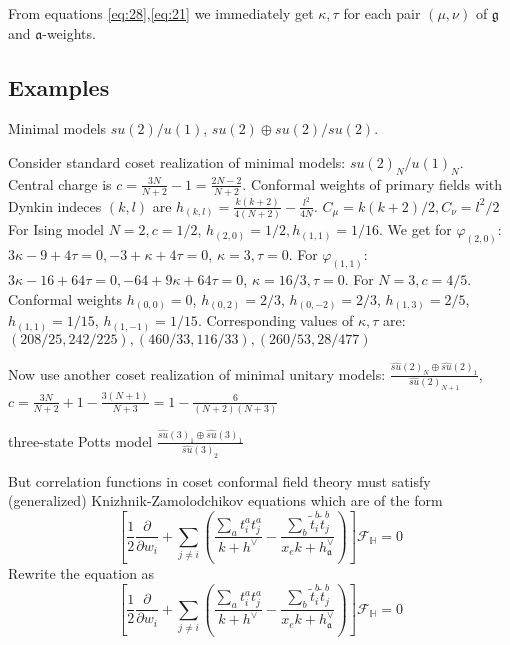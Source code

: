 \documentclass{jetpl}
\newcommand{\gf}{\mathfrak{g}}
\newcommand{\af}{\mathfrak{a}}
\begin{document}
From equations \eqref{eq:28},\eqref{eq:21} we immediately get $\kappa,\tau$ for each pair $(\mu,\nu)$ of $\gf$ and $\af$-weights. 

\subsection{Examples}
\label{sec:examples-1}

Minimal models $su(2)/u(1)$, $su(2)\oplus su(2)/su(2)$.

Consider standard coset realization of minimal models: $su(2)_{N}/u(1)_{N}$. Central charge is $c=\frac{3N}{N+2}-1=\frac{2N-2}{N+2}$. Conformal weights of primary fields with Dynkin indeces $(k,l)$ are $h_{(k,l)}=\frac{k(k+2)}{4(N+2)}-\frac{l^{2}}{4N}$. $C_{\mu}=k(k+2)/2, C_{\nu}=l^{2}/2$
For Ising model $N=2,c=1/2$, $h_{(2,0)}=1/2, h_{(1,1)}=1/16$. We get for $\varphi_{(2,0)}$: $3\kappa-9+4\tau =0, -3+\kappa+4\tau=0$, $\kappa=3, \tau=0$. For $\varphi_{(1,1)}$: $3\kappa-16+64\tau=0, -64+9\kappa + 64\tau=0$, $\kappa=16/3, \tau=0$. 
For $N=3, c=4/5$. Conformal weights $h_{(0,0)}=0$, $h_{(0,2)}=2/3$, $h_{(0,-2)}=2/3$, $h_{(1,3)}=2/5$, $h_{(1,1)}=1/15$, $h_{(1,-1)}=1/15$.  Corresponding values of $\kappa,\tau$ are: $(208/25,242/225), (460/33,116/33),(260/53,28/477)$

Now use another coset realization of minimal unitary models: $\frac{\hat{su}(2)_{N}\oplus \hat{su}(2)_{1}}{\hat{su}(2)_{N+1}}$, $c=\frac{3N}{N+2}+1-\frac{3(N+1)}{N+3}=1-\frac{6}{(N+2)(N+3)}$

three-state Potts model $\frac{\hat{su}(3)_{1}\oplus \hat{su}(3)_{1}}{\hat{su}(3)_{2}}$

But correlation functions in coset conformal field theory must satisfy (generalized) Knizhnik-Zamolodchikov equations \cite{kogan1997knizhnik} which are of the form
\begin{equation}
  \label{eq:16}
 \left[ \frac{1}{2}\frac{\partial}{\partial w_{i}} +\sum_{j\neq i} \left( \frac{\sum_{a}t_{i}^{a}t_{j}^{a}}{k+h^{\vee}}-\frac{\sum_{b}\tilde t_{i}^{b}\tilde t_{j}^{b}}{x_{e}k+h_{\af}^{\vee}}\right) \right]\mathcal{F}_{\mathbb{H}}=0
\end{equation}
Rewrite the equation as
\begin{equation}
  \label{eq:22}
  \left[ \frac{1}{2}\frac{\partial}{\partial w_{i}} +\sum_{j\neq i} \left( \frac{\sum_{a}t_{i}^{a}t_{j}^{a}}{k+h^{\vee}}-\frac{\sum_{b}\tilde t_{i}^{b}\tilde t_{j}^{b}}{x_{e}k+h_{\af}^{\vee}}\right) \right]\mathcal{F}_{\mathbb{H}}=0
\end{equation}
\end{document}
